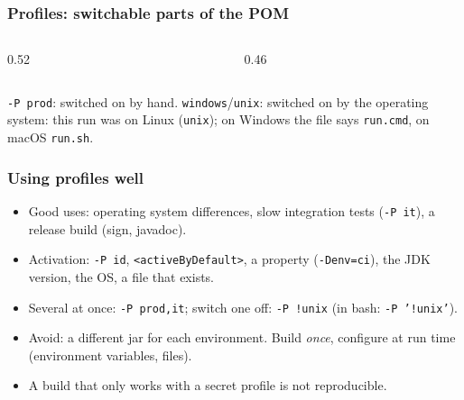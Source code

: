 \documentclass[aspectratio=169,10pt,compress]{beamer}
\begin{document}




\begin{frame}[t,fragile] \frametitle{Profiles: switchable parts of the POM}
  \begin{columns}[T]
    \begin{column}{0.52\textwidth}
    \end{column}
    \begin{column}{0.46\textwidth}
    \end{column}
  \end{columns}
  \vspace{0.2em}
  \small \texttt{-P prod}: switched on by hand. \texttt{windows}/\texttt{unix}: switched on by the operating system: this run was on Linux (\texttt{unix}); on Windows the file says \texttt{run.cmd}, on macOS \texttt{run.sh}.
\end{frame}




\begin{frame}[t,fragile] \frametitle{Using profiles well}
  \begin{itemize}\small
    \item Good uses: operating system differences, slow integration tests (\texttt{-P it}), a release build (sign, javadoc).
    \item Activation: \texttt{-P id}, \texttt{<activeByDefault>}, a property (\texttt{-Denv=ci}), the JDK version, the OS, a file that exists.
    \item Several at once: \texttt{-P prod,it}; switch one off: \texttt{-P !unix} (in bash: \texttt{-P '!unix'}).
    \item Avoid: a different jar for each environment. Build \emph{once}, configure at run time (environment variables, files).
    \item A build that only works with a secret profile is not reproducible.
  \end{itemize}
\end{frame}
\end{document}
